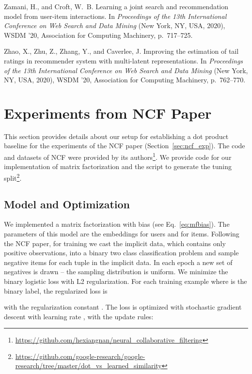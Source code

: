 \documentclass{article}
\begin{document}
\begin{thebibliography}{10}
{\sc Zamani, H., and Croft, W.~B.}
\newblock Learning a joint search and recommendation model from user-item
  interactions.
\newblock In {\em Proceedings of the 13th International Conference on Web
  Search and Data Mining\/} (New York, NY, USA, 2020), WSDM ’20, Association
  for Computing Machinery, p.~717–725.

{\sc Zhao, X., Zhu, Z., Zhang, Y., and Caverlee, J.}
\newblock Improving the estimation of tail ratings in recommender system with
  multi-latent representations.
\newblock In {\em Proceedings of the 13th International Conference on Web
  Search and Data Mining\/} (New York, NY, USA, 2020), WSDM ’20, Association
  for Computing Machinery, p.~762–770.

\end{thebibliography}
 
\appendix

\section{Experiments from NCF Paper}
\label{sec:ncf_exp_details}

This section provides details about our setup for establishing a dot product baseline for the experiments of the NCF paper (Section~\ref{sec:ncf_exp}).
The code and datasets of NCF were provided by its authors\footnote{\url{https://github.com/hexiangnan/neural_collaborative_filtering}}.
We provide code for our implementation of matrix factorization and the script to generate the tuning split\footnote{\url{https://github.com/google-research/google-research/tree/master/dot_vs_learned_similarity}}.

\subsection{Model and Optimization}
We implemented a matrix factorization with bias (see Eq.~\ref{eq:mfbias}).
The parameters of this model are the embeddings  for  users and  for  items.
Following the NCF paper, for training we cast the implicit data, which contains only positive observations, into a binary two class classification problem and sample  negative items for each tuple in the implicit data.
In each epoch a new set of negatives is drawn -- the sampling distribution is uniform.
We minimize the binary logistic loss with L2 regularization.
For each training example  where  is the binary label, the regularized loss is

with the regularization constant .
The loss is optimized with stochastic gradient descent with learning rate , with the update rules:
\end{document}
